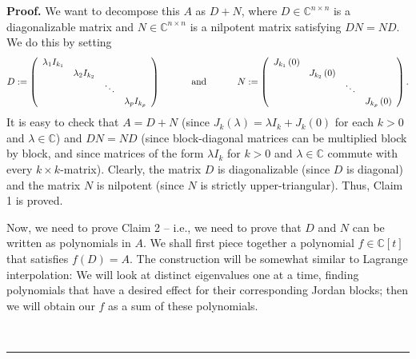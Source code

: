 \documentclass[numbers=enddot,12pt,final,onecolumn,notitlepage]{scrartcl}%
\numberwithin{exer}{subsection}
\theoremstyle{definition}
\newenvironment{proof}[1][Proof]{\noindent\textbf{#1.} }{\ \rule{0.5em}{0.5em}}
\newenvironment{noncompile}{}{}
\begin{document}
\begin{proof}
We want to decompose this $A$ as $D+N$, where $D\in\mathbb{C}^{n\times n}$ is
a diagonalizable matrix and $N\in\mathbb{C}^{n\times n}$ is a nilpotent matrix
satisfying $DN=ND$. We do this by setting%
\[
D:=\left(
\begin{array}
[c]{cccc}%
\lambda_{1}I_{k_{1}} &  &  & \\
& \lambda_{2}I_{k_{2}} &  & \\
&  & \ddots & \\
&  &  & \lambda_{p}I_{k_{p}}%
\end{array}
\right)  \ \ \ \ \ \ \ \ \ \ \text{and}\ \ \ \ \ \ \ \ \ \ N:=\left(
\begin{array}
[c]{cccc}%
J_{k_{1}}\left(  0\right)  &  &  & \\
& J_{k_{2}}\left(  0\right)  &  & \\
&  & \ddots & \\
&  &  & J_{k_{p}}\left(  0\right)
\end{array}
\right)  .
\]
It is easy to check that $A=D+N$ (since $J_{k}\left(  \lambda\right)  =\lambda
I_{k}+J_{k}\left(  0\right)  $ for each $k>0$ and $\lambda\in\mathbb{C}$) and
$DN=ND$ (since block-diagonal matrices can be multiplied block by block, and
since matrices of the form $\lambda I_{k}$ for $k>0$ and $\lambda\in
\mathbb{C}$ commute with every $k\times k$-matrix). Clearly, the matrix $D$ is
diagonalizable (since $D$ is diagonal) and the matrix $N$ is nilpotent (since
$N$ is strictly upper-triangular). Thus, Claim 1 is proved.

\begin{noncompile}
Now, we need to prove Claim 2 -- i.e., we need to prove that $D$ and $N$ can
be written as polynomials in $A$. We shall first piece together a polynomial
$f\in\mathbb{C}\left[  t\right]  $ that satisfies $f\left(  D\right)  =A$. The
construction will be somewhat similar to Lagrange interpolation: We will look
at distinct eigenvalues one at a time, finding polynomials that have a desired
effect for their corresponding Jordan blocks; then we will obtain our $f$ as a
sum of these polynomials.


\end{noncompile}
\end{proof}
\end{document}

